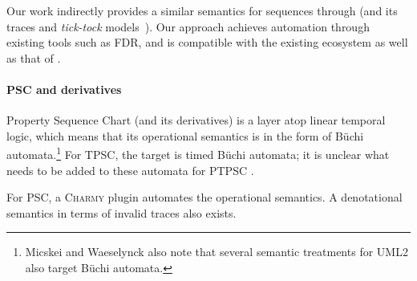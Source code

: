 Our work indirectly provides a similar semantics for \langname{}
sequences through \tockcsp{} (and its traces and \emph{tick-tock} models~\cite{Baxter21-TickTock}).
Our approach achieves automation through existing tools such as FDR,
and is compatible with the existing \robostar{} ecosystem as well as that of
\tockcsp.

\paragraph{PSC and derivatives}

Property Sequence Chart (and its derivatives) is a layer atop
linear temporal logic, which means that its operational semantics is
in the form of B\"uchi automata.\footnote{
Micskei and Waeselynck also note that several semantic treatments for UML2 also
target B\"uchi automata.}
For TPSC, the target is timed B\"uchi
automata; it is unclear what needs to be added to these automata for PTPSC .


For PSC, a \textsc{Charmy} plugin automates the operational semantics.  A denotational semantics in terms of
invalid traces also exists.